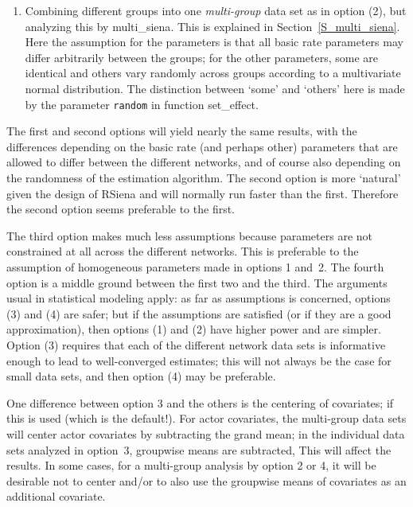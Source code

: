 \documentclass[a4paper,fleqn,11pt]{article}
\newcommand{\+}{\, + \,}
\newcommand{\sfn}[1]{\textsf{#1}}
\newcommand{\RS}{{\sf \textsf{RSiena} }}
\begin{document}
\begin{enumerate}
      that parameters are the same but using the same model specification,
      and post-processing the output files by a meta-analysis
      using \textsf{meta\_siena}.
      This is explained in Section~\ref{S_Siena08}.
\item Combining different groups into one \emph{multi-group} data set
      as in option (2), but analyzing this by \textsf{multi\_siena}.
      This is explained in Section~\ref{S_multi_siena}.\\
      Here the assumption for the parameters is that all basic rate parameters
      may differ arbitrarily between the groups;
      for the other parameters, some are identical and others vary randomly across
      groups according to a multivariate normal distribution.
      The distinction between `some' and `others' here is made by
      the parameter \texttt{random} in function \sfn{set\_effect}.
\end{enumerate}
The first and second options will yield nearly the same results, with the
differences depending on the basic rate (and perhaps other) parameters
that are
allowed to differ between the different networks, and of course
also depending on the randomness of the estimation algorithm.
The second option is more `natural' given the design of \RS and
will normally run faster than the first.
Therefore the second option seems preferable to the first.

The third option makes much less assumptions because parameters are not
constrained at all across the different networks.
This is preferable to the assumption of homogeneous parameters
made in options 1 and~2.
The fourth option is a middle ground between the first two and the third.
The arguments usual in statistical modeling apply:
as far as assumptions is concerned, options (3) and (4) are safer;
but if the assumptions are satisfied (or if they are a good approximation),
then options (1) and (2) have higher power and are simpler.
Option (3) requires that each of the different network data sets
is informative enough to lead to well-converged estimates;
this will not always be the case for small data sets,
and then option (4) may be preferable.

One difference between option 3 and the others is the centering of covariates;
if this is used (which is the default!).
For actor covariates, the multi-group data sets will center actor covariates
by subtracting the grand mean; in the individual data sets analyzed in option~3,
groupwise means are subtracted, This will affect the results.
In some cases, for a multi-group analysis by option 2 or 4, it will be desirable
not to center and/or to also use the groupwise means of covariates
as an additional covariate.
\end{document}
